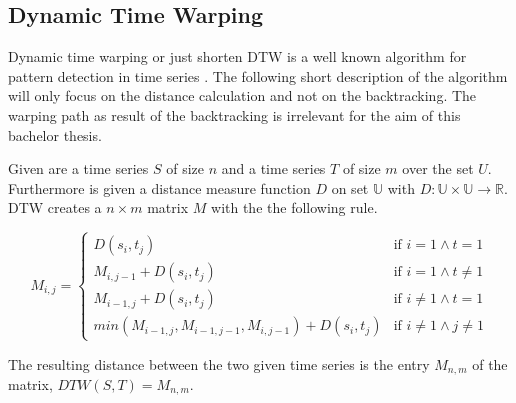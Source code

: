 \subsection{Dynamic Time Warping}
Dynamic time warping or just shorten DTW is a well known algorithm for pattern detection in time series
\cite{berndt1994using}. The following short description of the algorithm will only focus on the distance calculation and
not on the backtracking. The warping path as result of the backtracking is irrelevant for the aim of this bachelor
thesis.

Given are a time series $S$ of size $n$ and a time series $T$ of size $m$ over the set $U$. Furthermore is given a
distance measure function $D$ on set $\mathbb{U}$ with $D: \mathbb{U} \times \mathbb{U} \to \mathbb{R}$. DTW creates a
$n \times m$ matrix $M$ with the the following rule.
\begin{center} \[ M_{i, j} = \begin{cases}
    D(s_i,t_j) & \text{if } i = 1 \wedge t = 1\\
    M_{i,j-1} + D(s_i,t_j) & \text{if } i = 1 \wedge t \neq 1\\
    M_{i-1,j} + D(s_i,t_j) & \text{if } i \neq 1 \wedge t = 1\\
    min(M_{i-1,j}, M_{i-1,j-1}, M_{i,j-1}) + D(s_i,t_j) & \text{if } i \neq 1 \wedge j \neq 1
\end{cases} \] \end{center}
The resulting distance between the two given time series is the entry $M_{n,m}$ of the matrix, $DTW(S, T) = M_{n,m}$.
